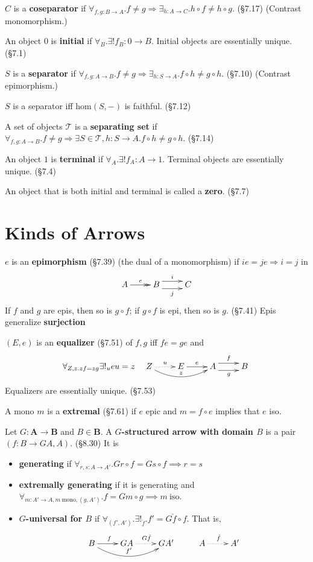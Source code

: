 \documentclass[10pt,twocolumn,letterpaper]{article}
\newcommand{\defn}[1]{{\bf #1}}
\begin{document}
  $C$ is a \defn{coseparator} if $\forall_{f,g : B \to A} . f \ne g
  \Rightarrow \exists_{h : A \to C} . h \circ f \ne h \circ g$. (\S7.17)
  (Contrast monomorphism.)

  An object $0$ is \defn{initial} if $\forall_B . \exists! f_B : 0 \to B$.
  Initial objects are essentially unique. (\S7.1)

  $S$ is a \defn{separator} if $\forall_{f,g : A \to B} . f \ne g
  \Rightarrow \exists_{h : S \to A} . f \circ h \ne g \circ h$. (\S7.10)
  (Contrast epimorphism.)

  $S$ is a separator iff $\mbox{hom}(S,-)$ is faithful. (\S7.12)

  A set of objects $\mathcal{T}$ is a \defn{separating set} if
  $\forall_{f,g : A \to B} . f \ne g \Rightarrow \exists{S \in \mathcal{T},
  h : S \to A} . f \circ h \ne g \circ h$. (\S7.14)

  An object $1$ is \defn{terminal} if $\forall_A . \exists! f_A : A \to 1$.
  Terminal objects are essentially unique. (\S7.4)

  An object that is both initial and terminal is called a \defn{zero}.
  (\S7.7)

\section{Kinds of Arrows}

  $e$ is an \defn{epimorphism} (\S7.39) (the dual of a monomorphism) if
  $ie = je \Rightarrow i = j$ in
    \[\xymatrix{A \ar@{->>}[r]^e & B \ar@<1ex>[r]^{i} \ar@<-1ex>[r]_j & C} \]
  If $f$ and $g$ are epis, then so is $g \circ f$; if $g \circ f$ is epi,
  then so is $g$. (\S7.41)  Epis generalize \defn{surjection} 

  $(E,e)$ is an \defn{equalizer} (\S7.51) of $f,g$ iff $fe = ge$ and
     \[\forall_{Z,z . zf = zg} \exists!_u eu = z \quad
     \xymatrix{
     Z \ar@{..>}[r]^u \ar@/_1pc/[rr]^{z} & E \ar[r]^e & A \ar@<1ex>[r]^f \ar@<-1ex>[r]_g & B \\
     }\]
  Equalizers are essentially unique. (\S7.53)

  A mono $m$ is a \defn{extremal} (\S7.61) if $e$ epic and
  $m = f \circ e$ implies that $e$ iso.

  Let $G: \mathbf{A} \to \mathbf{B}$ and $B \in \mathbf{B}$.  A
  \defn{$G$-structured arrow with domain $B$} is a pair $(f : B \to GA, A)$.
  (\S8.30)  It is
  \begin{itemize}
    \item \defn{generating} if $\forall_{r,s : A \to A'} . Gr \circ f = Gs
      \circ f \implies r = s$
    \item \defn{extremally generating} if it is generating and $\forall_{m :
      A' \to A, m ~\text{mono}, (g,A')} . f = Gm \circ g \implies m ~\text{iso}$.
    \item \defn{$G$-universal for $B$} if $\forall_{(f', A')} .
    \exists!_{\check f} . f' = G{\check f} \circ f$.  That is,
    \[\xymatrix{
        B \ar[r]^f \ar@/_1.25pc/[rr]^{f'}
        & GA \ar@{.>}[r]^{G{\check f}}
        & GA'
        & A \ar@{.>}[r]^{\check f}
        & A'
    }\]
  \end{itemize}
\end{document}
